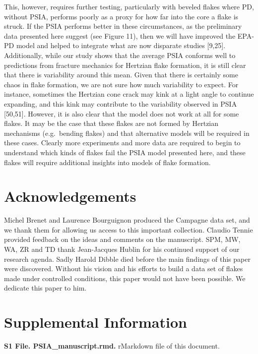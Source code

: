 \documentclass[10pt,letterpaper]{article}
\begin{document}
This, however, requires further testing, particularly with beveled
flakes where PD, without PSIA, performs poorly as a proxy for how far
into the core a flake is struck. If the PSIA performs better in these
circumstances, as the preliminary data presented here suggest (see
Figure 11), then we will have improved the EPA-PD model and helped to
integrate what are now disparate studies {[}9,25{]}. Additionally, while
our study shows that the average PSIA conforms well to predictions from
fracture mechanics for Hertzian flake formation, it is still clear that
there is variability around this mean. Given that there is certainly
some chaos in flake formation, we are not sure how much variability to
expect. For instance, sometimes the Hertzian cone crack may kink at a
light angle to continue expanding, and this kink may contribute to the
variability observed in PSIA {[}50,51{]}. However, it is also clear that
the model does not work at all for some flakes. It may be the case that
these flakes are not formed by Hertzian mechanisms (e.g.~bending flakes)
and that alternative models will be required in these cases. Clearly
more experiments and more data are required to begin to understand which
kinds of flakes fail the PSIA model presented here, and these flakes
will require additional insights into models of flake formation.

\hypertarget{acknowledgements}{%
\section{Acknowledgements}\label{acknowledgements}}

Michel Brenet and Laurence Bourguignon produced the Campagne data set,
and we thank them for allowing us access to this important collection.
Claudio Tennie provided feedback on the ideas and comments on the
manuscript. SPM, MW, WA, ZR and TD thank Jean-Jacques Hublin for his
continued support of our research agenda. Sadly Harold Dibble died
before the main findings of this paper were discovered. Without his
vision and his efforts to build a data set of flakes made under
controlled conditions, this paper would not have been possible. We
dedicate this paper to him.

\hypertarget{supplemental-information}{%
\section{Supplemental Information}\label{supplemental-information}}

\textbf{S1 File. PSIA\_manuscript.rmd.} rMarkdown file of this document.
\end{document}
